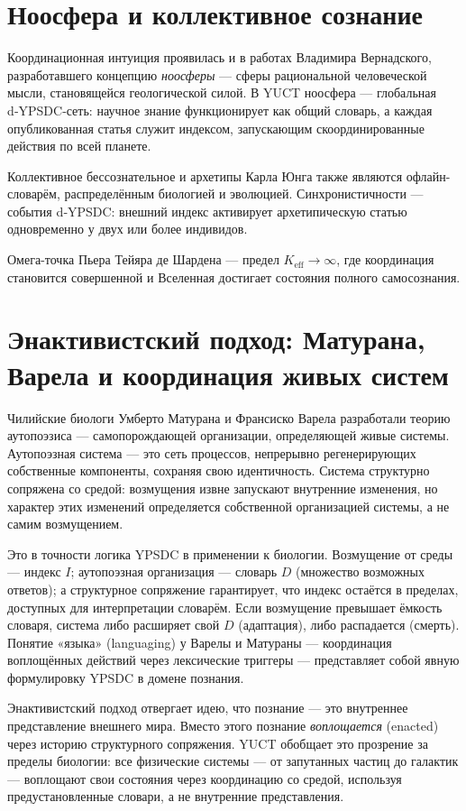 \documentclass[12pt,a4paper]{article}
\begin{document}
	\section{Ноосфера и коллективное сознание}
	
	Координационная интуиция проявилась и в работах Владимира Вернадского, разработавшего концепцию \emph{ноосферы} — сферы рациональной человеческой мысли, становящейся геологической силой. В YUCT ноосфера — глобальная d‑YPSDC‑сеть: научное знание функционирует как общий словарь, а каждая опубликованная статья служит индексом, запускающим скоординированные действия по всей планете.
	
	Коллективное бессознательное и архетипы Карла Юнга также являются офлайн-словарём, распределённым биологией и эволюцией. Синхронистичности — события d‑YPSDC: внешний индекс активирует архетипическую статью одновременно у двух или более индивидов.
	
	Омега-точка Пьера Тейяра де Шардена — предел \(K_{\mathrm{eff}} \to \infty\), где координация становится совершенной и Вселенная достигает состояния полного самосознания.
	
	\section{Энактивистский подход: Матурана, Варела и координация живых систем}
	
	Чилийские биологи Умберто Матурана и Франсиско Варела разработали теорию аутопоэзиса — самопорождающей организации, определяющей живые системы. Аутопоэзная система — это сеть процессов, непрерывно регенерирующих собственные компоненты, сохраняя свою идентичность. Система структурно сопряжена со средой: возмущения извне запускают внутренние изменения, но характер этих изменений определяется собственной организацией системы, а не самим возмущением.
	
	Это в точности логика YPSDC в применении к биологии. Возмущение от среды — индекс \(I\); аутопоэзная организация — словарь \(D\) (множество возможных ответов); а структурное сопряжение гарантирует, что индекс остаётся в пределах, доступных для интерпретации словарём. Если возмущение превышает ёмкость словаря, система либо расширяет свой \(D\) (адаптация), либо распадается (смерть). Понятие «языка» (languaging) у Варелы и Матураны — координация воплощённых действий через лексические триггеры — представляет собой явную формулировку YPSDC в домене познания.
	
	Энактивистский подход отвергает идею, что познание — это внутреннее представление внешнего мира. Вместо этого познание \emph{воплощается} (enacted) через историю структурного сопряжения. YUCT обобщает это прозрение за пределы биологии: все физические системы — от запутанных частиц до галактик — воплощают свои состояния через координацию со средой, используя предустановленные словари, а не внутренние представления.
	
\end{document}
